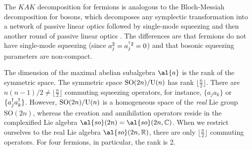 The $KAK$ decomposition for fermions is analogous to the Bloch-Messiah decomposition for bosons, which decomposes any symplectic transformation into a network of passive linear optics followed by single-mode squeezing and then another round of passive linear optics \cite{Braunstein05}. The differences are that fermions do not have single-mode squeezing (since $ a_j^2 = a^{^{\dagger} 2}_j = 0 $) and that bosonic squeezing parameters are non-compact.

The dimension of the maximal abelian subalgebra $\al{a}$ is the rank of the symmetric space. The symmetric space $\text{SO}(2n)/\text{U}(n)$ has rank $\lfloor \frac{n}{2} \rfloor$.  There are $n(n-1)/2 \neq \lfloor \frac{n}{2} \rfloor$ commuting squeezing operators, for instance, $\{a_j a_k\}$ or $\{ a^{\dagger}_j a^{\dagger}_k \}$. However, $\text{SO}(2n)/\text{U}(n)$ is a homogeneous space of the \emph{real} Lie group $\text{SO}(2n)$, whereas the creation and annihilation operators reside in the complexified Lie algebra $\al{so}(2n) = \al{so}(2n,{\mathbb{C}})$. When we restrict ourselves to the real Lie algebra $\al{so}(2n,{\mathbb{R}})$, there are only $\lfloor \frac{n}{2} \rfloor$ commuting operators. For four fermions, in particular, the rank is 2.


